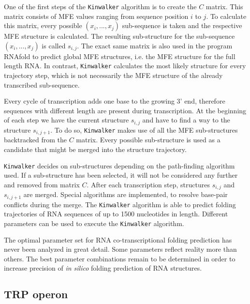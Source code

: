 \documentclass[ twoside,openright,titlepage,numbers=noenddot,headinclude,%
                footinclude=false, cleardoublepage=empty,abstractoff, %
                BCOR=5mm,paper=a4,fontsize=11pt,%
                ngerman,american,%
                ]{scrreprt}
\begin{document}
One of the first steps of the \texttt{Kinwalker} algorithm is to create the
$C$ matrix. This matrix consists of MFE values ranging from sequence
position $i$ to $j$. To calculate this matrix, every possible
$(x_i,...,x_j)$ sub-sequence is taken and the respective MFE structure is
calculated. The resulting sub-structure for the sub-sequence $(x_i,...,x_j)$ is called $s_{i,j}$. 
The exact same matrix is also used in the program RNAfold to
predict global MFE structures, i.e. the MFE structure for the full length
RNA.
In contrast, \texttt{Kinwalker} calculates the most likely structure for
every trajectory step, which is not necessarily the MFE structure of
the already transcribed sub-sequence.  

Every cycle of transcription adds one base to the growing 3' end,
therefore sequences with different length are present during
transcription. At the beginning of each step we have the current
structure $s_{i,j}$ and have to find a way to the structure $s_{i,j+1}$. To do so,
\texttt{Kinwalker} makes use of all the MFE sub-structures backtracked from
the $C$ matrix. Every possible sub-structure is used as a candidate that
might be merged into the structure trajectory.


\texttt{Kinwalker} decides on sub-structures depending on the path-finding
algorithm used. If a sub-structure has been selected, it will not be
considered any further and removed from matrix $C$. After each
transcription step, structures $s_{i,j}$ and $s_{i,j+1}$ are
merged. Special algorithms are implemented, to resolve base-pair conflicts
during the merge. The \texttt{Kinwalker} algorithm is able to predict
folding trajectories of RNA sequences of up to 1500 nucleotides in length. 
Different parameters can be used to execute the \texttt{Kinwalker}
algorithm.

The optimal parameter set for RNA co-transcriptional folding prediction has
never been analyzed in great detail.  Some parameters reflect reality more
than others. The best parameter combinations remain to be determined in
order to increase precision of \textit{in silico} folding prediction of RNA
structures.



\subsection{TRP operon}
\end{document}
